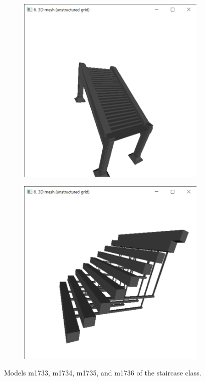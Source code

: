 \documentclass{bigdata}
\begin{document}
\begin{figure}[h!]
\begin{subfigure}[b]{0.2\linewidth}
  \end{subfigure}
  \begin{subfigure}[b]{0.2\linewidth}
    \includegraphics[width=\linewidth]{Pictures/Evaluation/staircaseClass/stair3.png}
  \end{subfigure}
  \begin{subfigure}[b]{0.2\linewidth}
    \includegraphics[width=\linewidth]{Pictures/Evaluation/staircaseClass/stair4.png}
  \end{subfigure}
  \caption{Models m1733, m1734, m1735, and m1736 of the staircase class.}
  \label{fig:bunny}
\end{figure}
\end{document}
